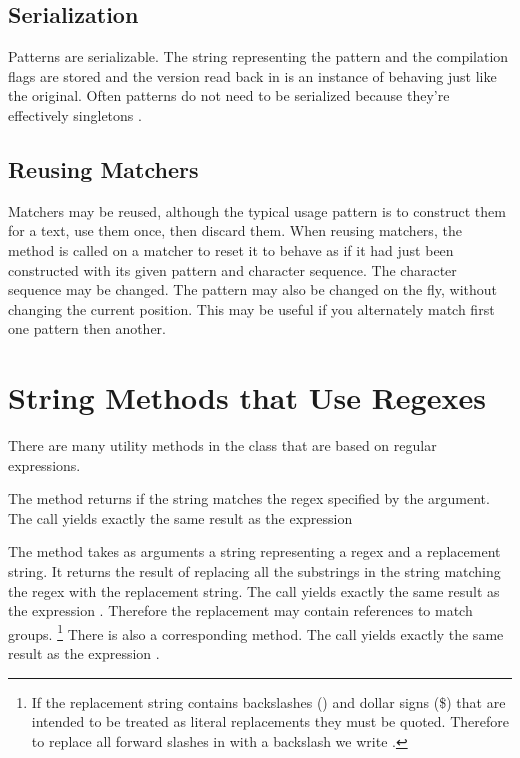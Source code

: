 \subsection{Serialization}

Patterns are serializable.  The string representing the pattern and
the compilation flags are stored and the version read back in is an
instance of  behaving just like the original.  Often
patterns do not need to be serialized because they're effectively
singletons .

\subsection{Reusing Matchers}

Matchers may be reused, although the typical usage pattern
is to construct them for a text, use them once, then discard them.
When reusing matchers, the  method is called on a
matcher to reset it to behave as if it had just been constructed with
its given pattern and character sequence.
The character sequence may
be changed.  The pattern may also be changed on the fly, without
changing the current position.  This may be useful if you alternately
match first one pattern then another.

\section{String Methods that Use Regexes}

There are many utility methods in the  class that
are based on regular expressions.   

The method  returns  if the string
matches the regex specified by the argument. 
The call  yields exactly the same result as the expression

The method  takes as arguments
a string representing a regex and a replacement string.
It returns the result
of replacing all the substrings in the string matching the regex
with the replacement string.
The call  yields exactly the same result as the expression
.
Therefore the replacement may contain references to match groups.%
%
\footnote{ 
If the replacement string contains backslashes (\bk) and
dollar signs (\$) that are intended to be treated as literal
replacements they must be quoted.  Therefore to replace all forward
slashes in  with a backslash we write
.
}
%
There is also a corresponding  method.
The call  yields exactly the same result as the expression
.

